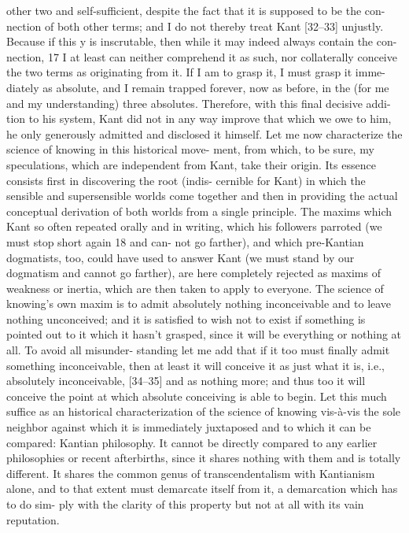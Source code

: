 other two and self-sufficient, despite the fact that it is supposed to be the con-
nection of both other terms; and I do not thereby treat Kant [32–33] unjustly.
Because if this y is inscrutable, then while it may indeed always contain the con-
nection, 17 I at least can neither comprehend it as such, nor collaterally conceive
the two terms as originating from it. If I am to grasp it, I must grasp it imme-
diately as absolute, and I remain trapped forever, now as before, in the (for me
and my understanding) three absolutes. Therefore, with this final decisive addi-
tion to his system, Kant did not in any way improve that which we owe to him,
he only generously admitted and disclosed it himself.
Let me now characterize the science of knowing in this historical move-
ment, from which, to be sure, my speculations, which are independent from
Kant, take their origin. Its essence consists first in discovering the root (indis-
cernible for Kant) in which the sensible and supersensible worlds come
together and then in providing the actual conceptual derivation of both worlds
from a single principle. The maxims which Kant so often repeated orally and
in writing, which his followers parroted (we must stop short again 18 and can-
not go farther), and which pre-Kantian dogmatists, too, could have used to
answer Kant (we must stand by our dogmatism and cannot go farther), are
here completely rejected as maxims of weakness or inertia, which are then
taken to apply to everyone. The science of knowing’s own maxim is to admit
absolutely nothing inconceivable and to leave nothing unconceived; and it is
satisfied to wish not to exist if something is pointed out to it which it hasn’t
grasped, since it will be everything or nothing at all. To avoid all misunder-
standing let me add that if it too must finally admit something inconceivable,
then at least it will conceive it as just what it is, i.e., absolutely inconceivable,
[34–35] and as nothing more; and thus too it will conceive the point at which
absolute conceiving is able to begin. Let this much suffice as an historical
characterization of the science of knowing vis-à-vis the sole neighbor against
which it is immediately juxtaposed and to which it can be compared: Kantian
philosophy. It cannot be directly compared to any earlier philosophies or
recent afterbirths, since it shares nothing with them and is totally different. It
shares the common genus of transcendentalism with Kantianism alone, and to
that extent must demarcate itself from it, a demarcation which has to do sim-
ply with the clarity of this property but not at all with its vain reputation.

